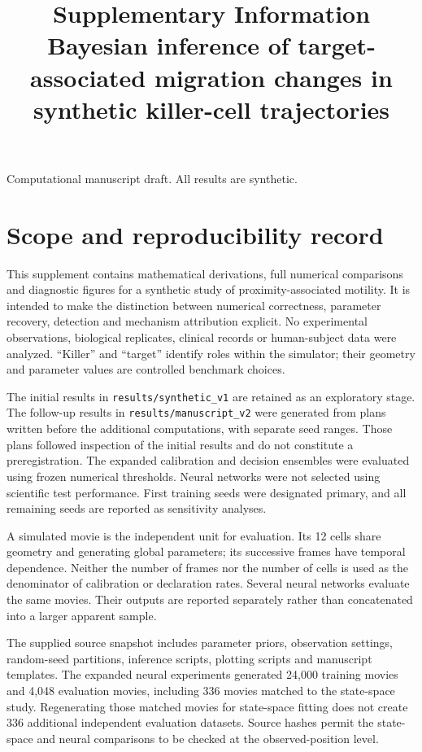 \documentclass[11pt]{article}
\begin{document}
\title{Supplementary Information\\[6pt]\large Bayesian inference of target-associated migration changes in synthetic killer-cell trajectories}
\author{}
\date{}
\maketitle
\begin{center}Computational manuscript draft. All results are synthetic.\end{center}
\tableofcontents
\clearpage
\section{Scope and reproducibility record}
This supplement contains mathematical derivations, full numerical comparisons and diagnostic figures for a synthetic study of proximity-associated motility. It is intended to make the distinction between numerical correctness, parameter recovery, detection and mechanism attribution explicit. No experimental observations, biological replicates, clinical records or human-subject data were analyzed. ``Killer'' and ``target'' identify roles within the simulator; their geometry and parameter values are controlled benchmark choices.

The initial results in \texttt{results/synthetic\_v1} are retained as an exploratory stage. The follow-up results in \texttt{results/manuscript\_v2} were generated from plans written before the additional computations, with separate seed ranges. Those plans followed inspection of the initial results and do not constitute a preregistration. The expanded calibration and decision ensembles were evaluated using frozen numerical thresholds. Neural networks were not selected using scientific test performance. First training seeds were designated primary, and all remaining seeds are reported as sensitivity analyses.

A simulated movie is the independent unit for evaluation. Its 12 cells share geometry and generating global parameters; its successive frames have temporal dependence. Neither the number of frames nor the number of cells is used as the denominator of calibration or declaration rates. Several neural networks evaluate the same movies. Their outputs are reported separately rather than concatenated into a larger apparent sample.

The supplied source snapshot includes parameter priors, observation settings, random-seed partitions, inference scripts, plotting scripts and manuscript templates. The expanded neural experiments generated 24,000 training movies and 4,048 evaluation movies, including 336 movies matched to the state-space study. Regenerating those matched movies for state-space fitting does not create 336 additional independent evaluation datasets. Source hashes permit the state-space and neural comparisons to be checked at the observed-position level.
\end{document}
